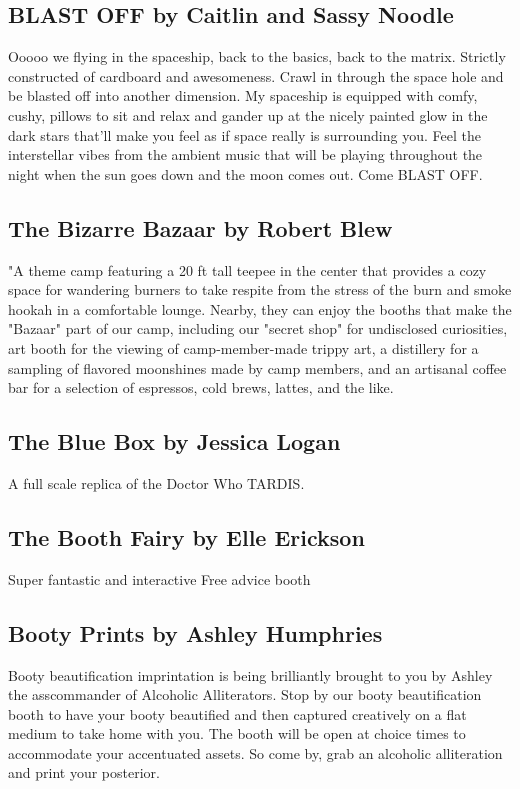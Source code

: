 \begin{multicols}{2}
\subsection*{BLAST OFF by Caitlin and Sassy Noodle                }
Ooooo we flying in the spaceship, back to the basics, back to the matrix. Strictly constructed of cardboard and awesomeness. Crawl in through the space hole and be blasted off into another dimension. My spaceship is equipped with comfy, cushy, pillows to sit and relax and gander up at the nicely painted glow in the dark stars that’ll make you feel as if space really is surrounding you. Feel the interstellar vibes from the ambient music that will be playing throughout the night when the sun goes down and the moon comes out. Come BLAST OFF.        
                
\subsection*{The Bizarre Bazaar        by Robert Blew        }
"A theme camp featuring a 20 ft tall teepee in the center that provides a cozy space for wandering burners to take respite from the stress of the burn and smoke hookah in a comfortable lounge. Nearby, they can enjoy the booths that make the "Bazaar" part of our camp, including our "secret shop" for undisclosed curiosities, art booth for the viewing of camp-member-made trippy art, a distillery for a sampling of flavored moonshines made by camp members, and an artisanal coffee bar for a selection of espressos, cold brews, lattes, and the like.


\subsection*{The Blue Box by Jessica Logan                 }
        A full scale replica of the Doctor Who TARDIS.


\subsection*{The Booth Fairy by Elle Erickson                }
        Super fantastic and interactive Free advice booth




\subsection*{Booty Prints by Ashley Humphries                        }
Booty beautification imprintation is being brilliantly brought to you by Ashley the asscommander of Alcoholic Alliterators. Stop by our booty beautification booth to have your booty beautified and then captured creatively on a flat medium to take home with you. The booth will be open at choice times to accommodate your accentuated assets. So come by, grab an alcoholic alliteration and print your posterior.



\end{multicols}

